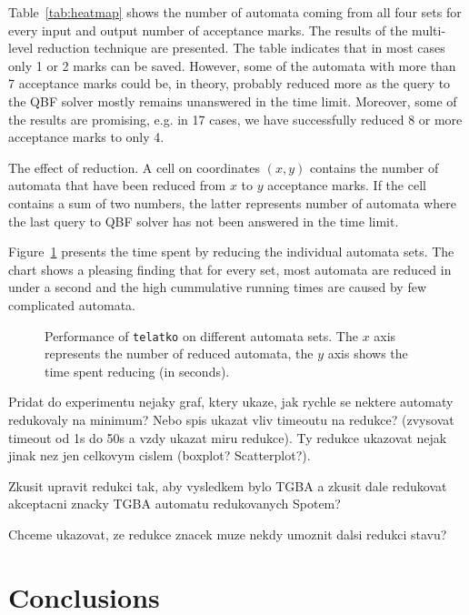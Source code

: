 \documentclass[a4paper,UKenglish,cleveref, autoref, thm-restate]{lipics-v2021}
\newcommand{\telatko}{\texttt{telatko}\xspace}
\begin{document}
Table~\ref{tab:heatmap} shows the number of automata coming from all four sets
for every input and output number of acceptance marks. The results of the
multi-level reduction technique are presented. The table indicates that in most
cases only 1 or 2 marks can be saved. However, some of the automata with
more than 7 acceptance marks could be, in theory, probably reduced more as
the query to the QBF solver mostly remains unanswered in the time limit.
Moreover, some of the results are promising, e.g. in 17 cases, we have
successfully reduced 8 or more acceptance marks to only 4.

\begin{table}[t]
\caption{The effect of reduction.
A cell on coordinates $(x,y)$ contains the number of automata that have been
reduced from $x$ to $y$ acceptance marks. If the cell contains a sum of two
numbers, the latter represents number of automata where the last query to QBF
solver has not been answered in the time limit.}
\label{tab:heatmap}
\setlength{\tabcolsep}{4pt}
\centering

\end{table}

Figure~\ref{fig:quantile} presents the time spent by reducing the individual
automata sets. The chart shows a pleasing finding that for every set, most
automata are reduced in under a second and the high cummulative running times
are caused by few complicated automata.

\begin{figure}[h]
\caption{Performance of \telatko on different automata sets. The $x$ axis
represents the number of reduced automata, the $y$ axis shows the time spent
reducing (in seconds).}
\label{fig:quantile}
\centering

\end{figure}

Pridat do experimentu nejaky graf, ktery ukaze, jak rychle se nektere
automaty redukovaly na minimum? Nebo spis ukazat vliv timeoutu na
redukce?  (zvysovat timeout od 1s do 50s a vzdy ukazat miru
redukce). Ty redukce ukazovat nejak jinak nez jen celkovym cislem
(boxplot? Scatterplot?).

Zkusit upravit redukci tak, aby vysledkem bylo TGBA a zkusit dale
redukovat akceptacni znacky TGBA automatu redukovanych Spotem?

Chceme ukazovat, ze redukce znacek muze nekdy umoznit dalsi redukci stavu?


\section{Conclusions}\label{sec:conclusion}
\end{document}
